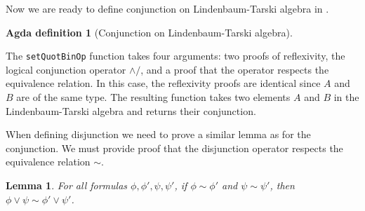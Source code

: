 \documentclass[titlepage]{article}
\newtheorem{lemma}{Lemma}[section]
\newtheorem{agdadef}{Agda definition}
\begin{document}
Now we are ready to define conjunction on Lindenbaum-Tarski algebra in \CubicalAgda.

\begin{agdadef}[Conjunction on Lindenbaum-Tarski algebra]$ $
\end{agdadef}


The \texttt{setQuotBinOp} function takes four arguments: two proofs of reflexivity, the logical conjunction operator $\wedge/$, and a proof that the operator respects the equivalence relation. In this case, the reflexivity proofs are identical since $A$ and $B$ are of the same type. The resulting function takes two elements $A$ and $B$ in the Lindenbaum-Tarski algebra and returns their conjunction.

When defining disjunction we need to prove a similar lemma as for the conjunction. We must provide proof that the disjunction operator respects the equivalence relation $\sim$.

\begin{lemma}
    For all formulas $\phi,\phi',\psi,\psi'$, if $\phi \sim \phi'$ and $\psi \sim \psi'$, then $\phi \vee \psi \sim \phi' \vee \psi'$.
\end{lemma}
\end{document}
